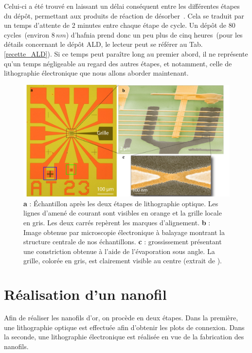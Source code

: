 Celui-ci a été trouvé en laissant un délai conséquent entre les différentes étapes du dépôt, permettant aux produits de réaction de désorber~\cite{Biercuk2003}. Cela se traduit par un temps d'attente de 2 minutes entre chaque étape de cycle. Un dépôt de 80\,cycles~(environ $8\,nm$) d'hafnia prend donc un peu plus de cinq heures~(pour les détails concernant le dépôt ALD, le lecteur peut se référer au Tab.\ref{recette_ALD}). Si ce temps peut paraître long au premier abord, il ne représente qu'un temps négligeable au regard des autres étapes, et notamment, celle de lithographie électronique que nous allons aborder maintenant.

\begin{figure}
\centering \includegraphics[scale=0.45]{Fabrication/FinalResult/FinalResult.pdf}
\caption{\textbf{a} : Échantillon après les deux étapes de lithographie optique. Les lignes d'amené de courant sont visibles en orange et la grille locale en gris. Les deux carrés repèrent les marques d'alignement. \textbf{b} : Image obtenue par microscopie électronique à balayage montrant la structure centrale de nos échantillons. \textbf{c} : grossissement présentant une constriction obtenue à l'aide de l'évaporation sous angle. La grille, colorée en gris, est clairement visible au centre (extrait de \cite{RochPhd}).}
\label{FinalResult}
\end{figure}


\section{Réalisation d'un nanofil}

Afin de réaliser les nanofils d'or, on procède en deux étapes. Dans la première, une lithographie optique est effectuée afin d'obtenir les plots de connexion. Dans la seconde, une lithographie électronique est réalisée en vue de la fabrication des nanofils.

